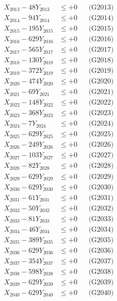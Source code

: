\documentclass[a4paper,10pt]{article}
\begin{document}
{\begin{align}
X_{2013} - 48Y_{2013} &\leq +0 && \text{(G2013)} \\
X_{2014} - 94Y_{2014} &\leq +0 && \text{(G2014)} \\
X_{2015} - 195Y_{2015} &\leq +0 && \text{(G2015)} \\
X_{2016} - 629Y_{2016} &\leq +0 && \text{(G2016)} \\
X_{2017} - 565Y_{2017} &\leq +0 && \text{(G2017)} \\
X_{2018} - 130Y_{2018} &\leq +0 && \text{(G2018)} \\
X_{2019} - 372Y_{2019} &\leq +0 && \text{(G2019)} \\
X_{2020} - 474Y_{2020} &\leq +0 && \text{(G2020)} \\
\allowbreak
X_{2021} - 69Y_{2021} &\leq +0 && \text{(G2021)} \\
X_{2022} - 148Y_{2022} &\leq +0 && \text{(G2022)} \\
X_{2023} - 368Y_{2023} &\leq +0 && \text{(G2023)} \\
X_{2024} - 7Y_{2024} &\leq +0 && \text{(G2024)} \\
X_{2025} - 629Y_{2025} &\leq +0 && \text{(G2025)} \\
X_{2026} - 249Y_{2026} &\leq +0 && \text{(G2026)} \\
X_{2027} - 103Y_{2027} &\leq +0 && \text{(G2027)} \\
X_{2028} - 82Y_{2028} &\leq +0 && \text{(G2028)} \\
X_{2029} - 629Y_{2029} &\leq +0 && \text{(G2029)} \\
X_{2030} - 629Y_{2030} &\leq +0 && \text{(G2030)} \\
\allowbreak
X_{2031} - 61Y_{2031} &\leq +0 && \text{(G2031)} \\
X_{2032} - 50Y_{2032} &\leq +0 && \text{(G2032)} \\
X_{2033} - 81Y_{2033} &\leq +0 && \text{(G2033)} \\
X_{2034} - 46Y_{2034} &\leq +0 && \text{(G2034)} \\
X_{2035} - 389Y_{2035} &\leq +0 && \text{(G2035)} \\
X_{2036} - 629Y_{2036} &\leq +0 && \text{(G2036)} \\
X_{2037} - 354Y_{2037} &\leq +0 && \text{(G2037)} \\
X_{2038} - 598Y_{2038} &\leq +0 && \text{(G2038)} \\
X_{2039} - 629Y_{2039} &\leq +0 && \text{(G2039)} \\
X_{2040} - 629Y_{2040} &\leq +0 && \text{(G2040)} \\

\end{align}}
\end{document}

